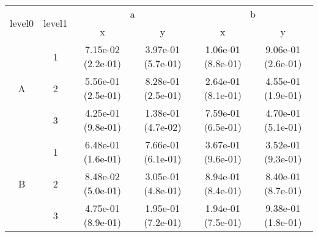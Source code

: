 \begin{tabular}{cccccc}
\toprule
\multirow{2}{*}{level0} & \multirow{2}{*}{level1}&\multicolumn{2}{c}{a}&\multicolumn{2}{c}{b}\tabularnewline
\cmidrule(lr){3-4}
\cmidrule(lr){5-6}
&&x&y&x&y\tabularnewline
\midrule
\multirow{3}{*}{A}&1& 7.15e-02 (2.2e-01)& 3.97e-01 (5.7e-01)& 1.06e-01 (8.8e-01)& 9.06e-01 (2.6e-01)\tabularnewline
&2& 5.56e-01 (2.5e-01)& 8.28e-01 (2.5e-01)& 2.64e-01 (8.1e-01)& 4.55e-01 (1.9e-01)\tabularnewline
&3& 4.25e-01 (9.8e-01)& 1.38e-01 (4.7e-02)& 7.59e-01 (6.5e-01)& 4.70e-01 (5.1e-01)\tabularnewline
\midrule
\multirow{3}{*}{B}&1& 6.48e-01 (1.6e-01)& 7.66e-01 (6.1e-01)& 3.67e-01 (9.6e-01)& 3.52e-01 (9.3e-01)\tabularnewline
&2& 8.48e-02 (5.0e-01)& 3.05e-01 (4.8e-01)& 8.94e-01 (8.4e-01)& 8.40e-01 (8.7e-01)\tabularnewline
&3& 4.75e-01 (8.9e-01)& 1.95e-01 (7.2e-01)& 1.94e-01 (7.5e-01)& 9.38e-01 (1.8e-01)\tabularnewline
\bottomrule
\end{tabular}
